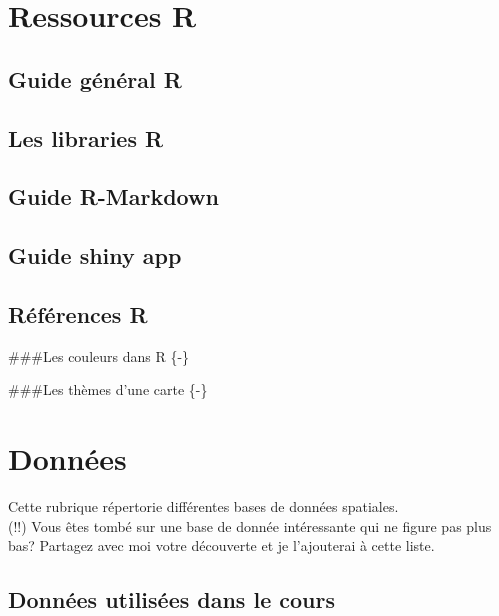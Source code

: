 \documentclass[
  12pt,
]{krantz}
\begin{document}
\hypertarget{ressources-r}{%
\chapter*{Ressources R}\label{ressources-r}}


\hypertarget{guide-guxe9nuxe9ral-r}{%
\section*{Guide général R}\label{guide-guxe9nuxe9ral-r}}


\hypertarget{les-libraries-r}{%
\section*{Les libraries R}\label{les-libraries-r}}


\hypertarget{guide-r-markdown}{%
\section*{Guide R-Markdown}\label{guide-r-markdown}}


\hypertarget{guide-shiny-app}{%
\section*{Guide shiny app}\label{guide-shiny-app}}


\hypertarget{ruxe9fuxe9rences-r}{%
\section*{Références R}\label{ruxe9fuxe9rences-r}}


\#\#\#Les couleurs dans R \{-\}

\#\#\#Les thèmes d'une carte \{-\}

\hypertarget{donnuxe9es}{%
\chapter*{Données}\label{donnuxe9es}}


Cette rubrique répertorie différentes bases de données spatiales.\\
(!!) Vous êtes tombé sur une base de donnée intéressante qui ne figure pas plus bas? Partagez avec moi votre découverte et je l'ajouterai à cette liste.

\hypertarget{donnuxe9es-utilisuxe9es-dans-le-cours}{%
\section*{Données utilisées dans le cours}\label{donnuxe9es-utilisuxe9es-dans-le-cours}}
\end{document}
